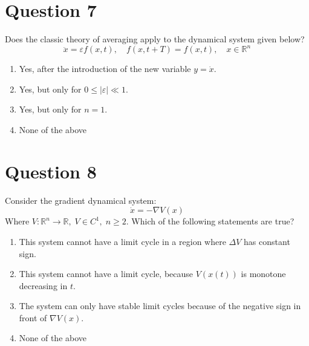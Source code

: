 \documentclass[twoside,10pt,a4paper]{article}
\begin{document}
\section*{Question 7}
Does the classic theory of averaging apply to the dynamical system given below?
\begin{equation*}
	\ddot{x} = \varepsilon f(x,t), \quad f(x, t + T) = f(x,t), \quad x \in \mathbb{R}^n
\end{equation*}

\begin{enumerate}[label=(\alph*)]
	\item Yes, after the introduction of the new variable $y = \dot{x}$.
	\item Yes, but only for $ 0 \leq |\varepsilon| \ll 1 $.
	\item Yes, but only for $n = 1$.
	\item None of the above
\end{enumerate}

\section*{Question 8}
Consider the gradient dynamical system:
\begin{equation*}
	\dot{x} = -\nabla V(x)
\end{equation*}
Where $V: \mathbb{R}^n \longrightarrow \mathbb{R}, \; V \in C^1, \; n \geq 2$. Which of the following statements are true?

\begin{enumerate}[label=(\alph*)]
	\item This system cannot have a limit cycle in a region where $\Delta V$ has constant sign.
	\item This system cannot have a limit cycle, because $ V(x(t)) $ is monotone decreasing in $t$.
	\item The system can only have stable limit cycles because of the negative sign in front of $\nabla V(x)$.
	\item None of the above
\end{enumerate}
\end{document}
